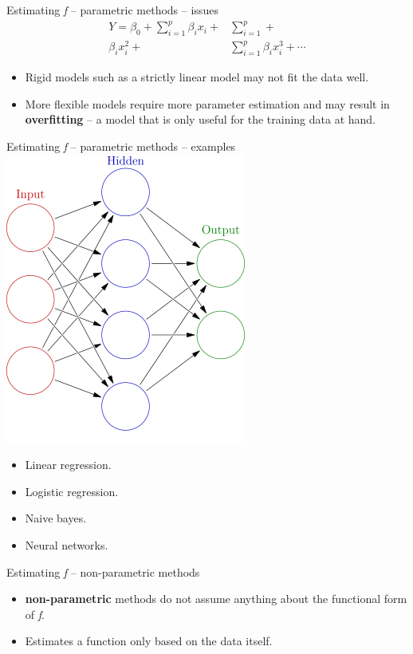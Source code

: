 \documentclass{beamer}
\begin{document}
\begin{frame}{Estimating \textit{f} -- parametric methods -- issues} %
\begin{align*}
Y = \beta_{0} + \sum_{i=1}^{p}\beta_{i} x_{i} + & \sum_{i=1}^{p} +  \\  
 \beta_{i} x_{i}^{2} + & \sum_{i=1}^{p}\beta_{i} x_{i}^{3} + \cdots
\end{align*}
	\begin{itemize}
		\item Rigid models such as a strictly linear model may not fit the data well.
		\item More flexible models require more parameter estimation and may result in \textbf{overfitting} -- a model that is only useful for the training data at hand.
	\end{itemize}

\end{frame}


\begin{frame}{Estimating \textit{f} -- parametric methods -- examples} %
\centering
\includegraphics[scale=.35]{neuralnets}
	\begin{itemize}
	\item Linear regression.
	\item Logistic regression.
	\item Naive bayes.
	\item Neural networks.
	\end{itemize}

\end{frame}


\begin{frame}{Estimating \textit{f} -- non-parametric methods} %
	\begin{itemize}
		\item \textbf{non-parametric} methods do not assume anything about the functional form of \textit{f}. 
		\item Estimates a function only based on the data itself.
	\end{itemize}

\end{frame}
\end{document}
